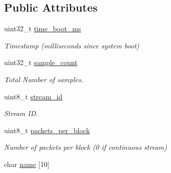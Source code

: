 \subsection*{Public Attributes}
\begin{DoxyCompactItemize}
\item 
\hypertarget{struct____mavlink__raw__data__stream__descriptor__t_ab6d6df3b40a653423ae90bc51644fcb6}{uint32\+\_\+t \hyperlink{struct____mavlink__raw__data__stream__descriptor__t_ab6d6df3b40a653423ae90bc51644fcb6}{time\+\_\+boot\+\_\+ms}}\label{struct____mavlink__raw__data__stream__descriptor__t_ab6d6df3b40a653423ae90bc51644fcb6}

\begin{DoxyCompactList}\small\item\em Timestamp (milliseconds since system boot) \end{DoxyCompactList}\item 
\hypertarget{struct____mavlink__raw__data__stream__descriptor__t_afb4df5a715652709786d43aa319774f7}{uint32\+\_\+t \hyperlink{struct____mavlink__raw__data__stream__descriptor__t_afb4df5a715652709786d43aa319774f7}{sample\+\_\+count}}\label{struct____mavlink__raw__data__stream__descriptor__t_afb4df5a715652709786d43aa319774f7}

\begin{DoxyCompactList}\small\item\em Total Number of samples. \end{DoxyCompactList}\item 
\hypertarget{struct____mavlink__raw__data__stream__descriptor__t_aadd8de891ae36b848842def5f75afddb}{uint8\+\_\+t \hyperlink{struct____mavlink__raw__data__stream__descriptor__t_aadd8de891ae36b848842def5f75afddb}{stream\+\_\+id}}\label{struct____mavlink__raw__data__stream__descriptor__t_aadd8de891ae36b848842def5f75afddb}

\begin{DoxyCompactList}\small\item\em Stream I\+D. \end{DoxyCompactList}\item 
\hypertarget{struct____mavlink__raw__data__stream__descriptor__t_a89d246b88d270ebb886a936b27765cf7}{uint8\+\_\+t \hyperlink{struct____mavlink__raw__data__stream__descriptor__t_a89d246b88d270ebb886a936b27765cf7}{packets\+\_\+per\+\_\+block}}\label{struct____mavlink__raw__data__stream__descriptor__t_a89d246b88d270ebb886a936b27765cf7}

\begin{DoxyCompactList}\small\item\em Number of packets per block (0 if continuous stream) \end{DoxyCompactList}\item 
\hypertarget{struct____mavlink__raw__data__stream__descriptor__t_ae2c26e7a88960f250c3a07ffe23728eb}{char \hyperlink{struct____mavlink__raw__data__stream__descriptor__t_ae2c26e7a88960f250c3a07ffe23728eb}{name} \mbox{[}10\mbox{]}}\label{struct____mavlink__raw__data__stream__descriptor__t_ae2c26e7a88960f250c3a07ffe23728eb}


\end{DoxyCompactItemize}
